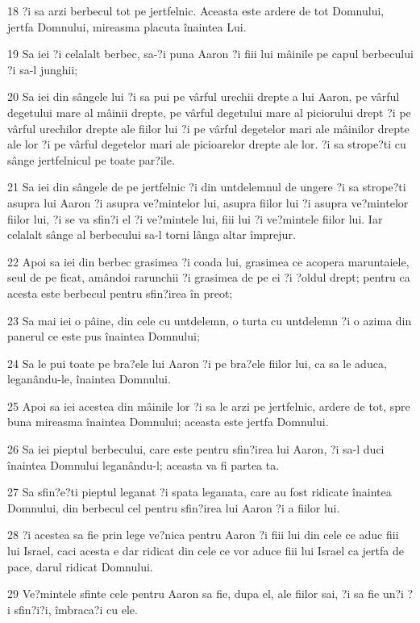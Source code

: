 \par 18 ?i sa arzi berbecul tot pe jertfelnic. Aceasta este ardere de tot Domnului, jertfa Domnului, mireasma placuta înaintea Lui.
\par 19 Sa iei ?i celalalt berbec, sa-?i puna Aaron ?i fiii lui mâinile pe capul berbecului ?i sa-l junghii;
\par 20 Sa iei din sângele lui ?i sa pui pe vârful urechii drepte a lui Aaron, pe vârful degetului mare al mâinii drepte, pe vârful degetului mare al piciorului drept ?i pe vârful urechilor drepte ale fiilor lui ?i pe vârful degetelor mari ale mâinilor drepte ale lor ?i pe vârful degetelor mari ale picioarelor drepte ale lor. ?i sa strope?ti cu sânge jertfelnicul pe toate par?ile.
\par 21 Sa iei din sângele de pe jertfelnic ?i din untdelemnul de ungere ?i sa strope?ti asupra lui Aaron ?i asupra ve?mintelor lui, asupra fiilor lui ?i asupra ve?mintelor fiilor lui, ?i se va sfin?i el ?i ve?mintele lui, fiii lui ?i ve?mintele fiilor lui. Iar celalalt sânge al berbecului sa-l torni lânga altar împrejur.
\par 22 Apoi sa iei din berbec grasimea ?i coada lui, grasimea ce acopera maruntaiele, seul de pe ficat, amândoi rarunchii ?i grasimea de pe ei ?i ?oldul drept; pentru ca acesta este berbecul pentru sfin?irea în preot;
\par 23 Sa mai iei o pâine, din cele cu untdelemn, o turta cu untdelemn ?i o azima din panerul ce este pus înaintea Domnului;
\par 24 Sa le pui toate pe bra?ele lui Aaron ?i pe bra?ele fiilor lui, ca sa le aduca, leganându-le, înaintea Domnului.
\par 25 Apoi sa iei acestea din mâinile lor ?i sa le arzi pe jertfelnic, ardere de tot, spre buna mireasma înaintea Domnului; aceasta este jertfa Domnului.
\par 26 Sa iei pieptul berbecului, care este pentru sfin?irea lui Aaron, ?i sa-l duci înaintea Domnului leganându-l; aceasta va fi partea ta.
\par 27 Sa sfin?e?ti pieptul leganat ?i spata leganata, care au fost ridicate înaintea Domnului, din berbecul cel pentru sfin?irea lui Aaron ?i a fiilor lui.
\par 28 ?i acestea sa fie prin lege ve?nica pentru Aaron ?i fiii lui din cele ce aduc fiii lui Israel, caci acesta e dar ridicat din cele ce vor aduce fiii lui Israel ca jertfa de pace, darul ridicat Domnului.
\par 29 Ve?mintele sfinte cele pentru Aaron sa fie, dupa el, ale fiilor sai, ?i sa fie un?i ?i sfin?i?i, îmbraca?i cu ele.
